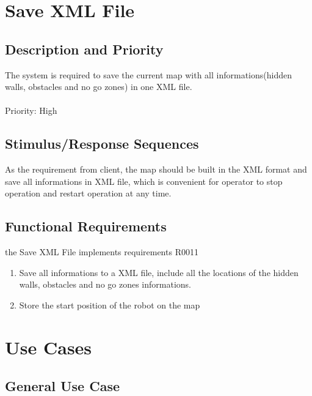 \documentclass[11pt, a4paper]{report}
\begin{document}
\section{Save XML File}
\subsection{Description and Priority}
The system is required to save the current map with all informations(hidden walls, obstacles and no go zones) in one XML file.\\ \\
Priority: High
\subsection{Stimulus/Response Sequences}
As the requirement from client, the map should be built in the XML format and save all informations in XML file, which is convenient for operator to stop operation and restart operation at any time.
\subsection{Functional Requirements}
the Save XML File implements requirements R0011
\begin{enumerate}
\item Save all informations to a XML file, include all the locations of the hidden walls, obstacles and no go zones informations.
\item Store the start position of the robot on the map  

\end{enumerate}


\section{Use Cases}
\subsection{General Use Case}
\end{document}
